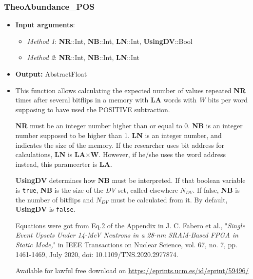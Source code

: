 \subsubsection*{TheoAbundance\_POS}\label{Subsec:TheoAbundance_POS}
%
\begin{itemize}
	\item \textbf{Input arguments}:
	\begin{itemize}
		\item \textit{Method 1}: \textbf{NR}::Int, \textbf{NB}::Int, \textbf{LN}::Int, \textbf{UsingDV}::Bool
		\item \textit{Method 2}: \textbf{NR}::Int, \textbf{NB}::Int, \textbf{LN}::Int
	\end{itemize}
	\item \textbf{Output:} AbstractFloat
	\item This function allows calculating the expected number of values repeated 	 \textbf{NR} times after several bitflips in a memory with \textbf{LA} words with \textit{W} bits per word   	supposing to have used the POSITIVE subtraction.
	
	\textbf{NR} must be an integer number higher than or equal to 0. 
	\textbf{NB} is an integer number supposed to be higher than 1.
	\textbf{LN} is an integer number, and indicates the size of the memory. If the researcher uses bit address for calculations, \textbf{LN} is \textbf{LA}\(\times\)\textbf{W}. However, if he/she uses the word address instead, this parameerter is \textbf{LA}.
	
	\textbf{UsingDV} determines how \textbf{NB} must be interpreted. If that boolean variable is \texttt{true}, \textbf{NB} is the size of the \textit{DV} set, called elsewhere \(N_{DV}\). If false, \textbf{NB} is the number of bitflips and \(N_{DV}\) must be calculated from it. By default, \textbf{UsingDV} is \texttt{false}.
	
	Equations were got from Eq.2 of the Appendix in J. C. Fabero et al., "\textit{Single Event Upsets Under 14-MeV Neutrons in a 28-nm
		SRAM-Based FPGA in Static Mode,}" in IEEE Transactions on Nuclear Science, vol.
	67, no. 7, pp. 1461-1469, July 2020, doi: 10.1109/TNS.2020.2977874.
	
	Available for lawful free download on \href{https://eprints.ucm.es/id/eprint/59496/}{https://eprints.ucm.es/id/eprint/59496/}
\end{itemize}

